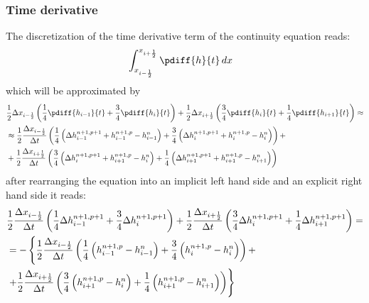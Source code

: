 \subsubsection{Time derivative}
The discretization of the time derivative term of the continuity equation reads:
\begin{align}
    & \int^{x_{i+\half}}_{x_{i-\half}} \pdiff{h}{t}\, dx
\end{align}
which will be approximated by
\begin{align}
    &\half \Delta x_{i-\half} \left( \frac{1}{4}\pdiff{h_{i-1}}{t} + \frac{3}{4}\pdiff{h_{i}}{t}  \right) +
    \half \Delta x_{i+\half} \left( \frac{3}{4}\pdiff{h_{i}}{t} + \frac{1}{4}\pdiff{h_{i+1}}{t} \right) \approx
    \nonumber \\*
    & \approx
    \half\frac{\Delta x_{i-\half}}{\Dt} \left(
    \frac{1}{4}\left(\Delta h^{n+1,p+1}_{i-1} + h^{n+1,p}_{i-1} - h^{n}_{i-1} \right) + \frac{3}{4}\left(\Delta h^{n+1,p+1}_{i} + h^{n+1,p}_{i}- h^{n}_{i}\right)
    \right) +
    \nonumber \\*
    & +
    \half\frac{\Delta x_{i+\half}}{\Dt} \left( \frac{3}{4}\left(\Delta h^{n+1,p+1}_{i} + h^{n+1,p}_{i+1}- h^{n}_{i}\right) + \frac{1}{4}\left(\Delta h^{n+1,p+1}_{i+1} + h^{n+1,p}_{i+1}- h^{n}_{i+1}\right)
    \right)
\end{align}
after rearranging the equation into an implicit left hand side and an explicit right hand side  it reads:
\begin{align}
    &  \frac{1}{2} \frac{\Delta x_{i-\frac{1}{2}}}{\Delta t} \left(
    \frac{1}{4}\Delta h^{n+1,p+1}_{i-1} + \frac{3}{4}\Delta h^{n+1,p+1}_{i}
    \right) +
    \frac{1}{2} \frac{\Delta x_{i+\frac{1}{2}}}{\Delta t} \left( \frac{3}{4}\Delta h^{n+1,p+1}_{i} + \frac{1}{4}\Delta h^{n+1,p+1}_{i+1}
    \right) =
    \nonumber \\
    &  = -\left\{
    \frac{1}{2} \frac{\Delta x_{i-\frac{1}{2}}}{\Delta t} \left(
\frac{1}{4}\left(h^{n+1,p}_{i-1} - h^{n}_{i-1} \right) + \frac{3}{4}\left(h^{n+1,p}_{i}- h^{n}_{i}\right)
\right) + \right.
\nonumber \\*
& \left. +
\frac{1}{2} \frac{\Delta x_{i+\frac{1}{2}}}{\Delta t} \left( \frac{3}{4}\left(h^{n+1,p}_{i+1}- h^{n}_{i}\right) + \frac{1}{4}\left(h^{n+1,p}_{i+1}- h^{n}_{i+1}\right)
\right)\right\}
\end{align}

